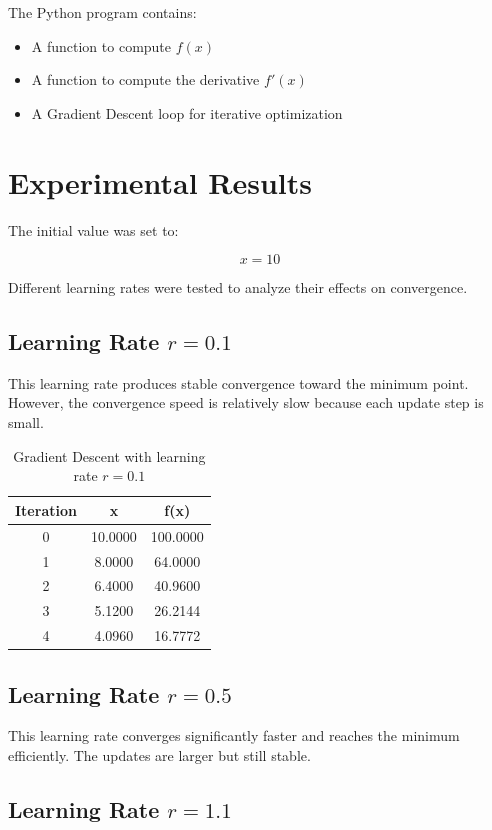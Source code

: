 \documentclass[12pt]{article}
\begin{document}
The Python program contains:
\begin{itemize}
    \item A function to compute \(f(x)\)
    \item A function to compute the derivative \(f'(x)\)
    \item A Gradient Descent loop for iterative optimization
\end{itemize}

\section{Experimental Results}

The initial value was set to:

\[
x = 10
\]

Different learning rates were tested to analyze their effects on convergence.

\subsection{Learning Rate \(r = 0.1\)}

This learning rate produces stable convergence toward the minimum point. 
However, the convergence speed is relatively slow because each update step is small.

\begin{table}[h]
\centering
\begin{tabular}{ccc}
\toprule
Iteration & x & f(x) \\
\midrule
0 & 10.0000 & 100.0000 \\
1 & 8.0000 & 64.0000 \\
2 & 6.4000 & 40.9600 \\
3 & 5.1200 & 26.2144 \\
4 & 4.0960 & 16.7772 \\
\bottomrule
\end{tabular}
\caption{Gradient Descent with learning rate \(r = 0.1\)}
\end{table}

\subsection{Learning Rate \(r = 0.5\)}

This learning rate converges significantly faster and reaches the minimum efficiently. 
The updates are larger but still stable.

\subsection{Learning Rate \(r = 1.1\)}
\end{document}
